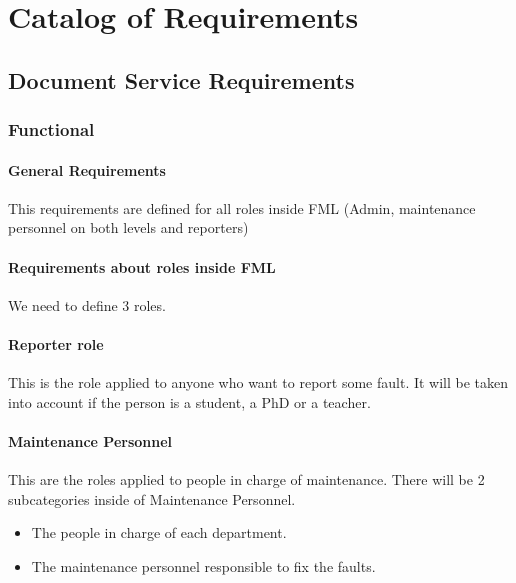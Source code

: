 \documentclass{report}
\begin{document}
\chapter{Catalog of Requirements}

\section{Document Service Requirements}

\subsection{Functional}


\subsubsection{General Requirements}

This requirements are defined for all roles inside FML (Admin, maintenance personnel on both levels and reporters)

\subsubsection{Requirements about roles inside FML}

We need to define 3 roles.

\subsubsection{Reporter role} This is the role applied to anyone who want to report some fault. It will be taken into account if the person is a student, a PhD or a teacher.

\subsubsection{Maintenance Personnel}

This are the roles applied to people in charge of maintenance. There will be 2 subcategories inside of Maintenance Personnel.

\begin{itemize}
\item The people in charge of each department.
\item The maintenance personnel responsible to fix the faults.
\end{itemize}
\end{document}
